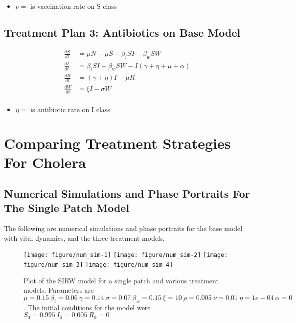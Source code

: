 \documentclass[12pt]{article}\usepackage[]{graphicx}\usepackage[]{color}
\newenvironment{knitrout}{}{} %
\begin{document}
\begin{itemize}
	\item $\nu=$ is vaccination rate on S class
\end{itemize}

\subsection{Treatment Plan 3: Antibiotics on Base Model}

\begin{linenomath}
\begin{align*}
	\frac{dS}{dt}&= \mu N - \mu S - \beta_i SI - \beta_w S W \\
	\frac{dI}{dt}&= \beta_i S I + \beta_w S W - I (\gamma +\eta + \mu + \alpha ) \\
	\frac{dR}{dt}&= (\gamma +\eta)I - \mu R \\
	\frac{dW}{dt}&= \xi I  - \sigma W\\
\end{align*}
\end{linenomath}
\begin{itemize}
	\item $\eta=$ is antibiotic rate on I class
\end{itemize}

\section{Comparing Treatment Strategies For Cholera}
\subsection{Numerical Simulations and Phase Portraits For The Single Patch Model}


The following are numerical simulations and phase portraits for the base model with vital dynamics, and the three treatment models.


\begin{knitrout}
\color{fgcolor}\begin{figure}

{\centering \texttt{[image: figure/num\_sim-1]} 
\texttt{[image: figure/num\_sim-2]} 
\texttt{[image: figure/num\_sim-3]} 
\texttt{[image: figure/num\_sim-4]} 

}

\caption{\label{fig:num.sim} Plot of the SIRW model for a single patch and various treatment models. Parameters are $\mu=0.15\ \beta_i=0.06\ \gamma=0.14\ \sigma=0.07\ \beta_w=0.15\ \xi=10\ \rho=0.005\ \nu=0.01\ \eta=1e-04\ \alpha=0$. The initial conditions for the model were $S_0=0.995\ I_0=0.005\ R_0=0$}\label{fig:num.sim}
\end{figure}


\end{knitrout}
\end{document}

